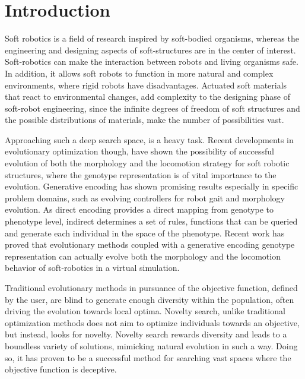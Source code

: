 
\chapter{Introduction} %

\label{Chapter1} %


Soft robotics is a field of research inspired by soft-bodied organisms, whereas the engineering and designing aspects of soft-structures are in the center of interest. Soft-robotics can make the interaction between robots and living organisms safe. In addition, it allows soft robots to  function in more natural and  complex environments, where rigid robots have disadvantages. Actuated soft materials that react to environmental changes, add complexity to the designing phase of soft-robot engineering, since the infinite degrees of freedom of soft structures and the possible distributions of materials, make the number of possibilities vast.

Approaching such a deep search space, is a heavy task. Recent developments in evolutionary optimization though, have shown the possibility of successful evolution of both the morphology and the locomotion strategy for soft robotic structures, where the genotype representation is of vital importance to the evolution. Generative encoding has shown promising results especially in specific problem domains, such as evolving controllers for robot gait and morphology evolution. As direct encoding provides a direct mapping from genotype to phenotype level, indirect determines a set of rules, functions that can be queried and generate each individual in the space of the phenotype. Recent work has proved that evolutionary methods coupled with a generative encoding genotype representation can actually evolve both the morphology and the locomotion behavior of soft-robotics in a virtual simulation.

Traditional evolutionary methods in pursuance of the objective function, defined by the user, are blind to generate enough diversity within the population, often driving the evolution towards local optima. Novelty search, unlike traditional optimization methods does not aim to optimize individuals towards an objective, but instead, looks for novelty. Novelty search rewards diversity and leads to a boundless variety of solutions, mimicking natural evolution in such a way. Doing so, it has proven to be a successful method for searching vast spaces where the objective function is deceptive.

